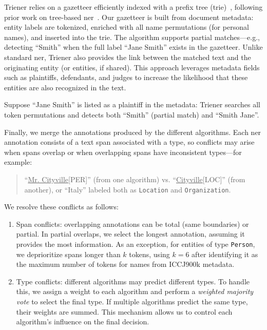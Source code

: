 Trie\ac{ner} relies on a gazetteer efficiently indexed with a prefix tree (trie)~\cite{s-yata-marisa-trie}, following prior work on tree-based \ac{ner}~\cite{Nguyen_tree_ner_2014}.  
Our gazetteer is built from document metadata: entity labels are tokenized, enriched with all name permutations (for personal names), and inserted into the trie.  
The algorithm supports partial matches---e.g., detecting ``Smith'' when the full label ``Jane Smith'' exists in the gazetteer.  
Unlike standard \ac{ner}, Trie\ac{ner} also provides the link between the matched text and the originating entity (or entities, if shared).  
This approach leverages metadata fields such as plaintiffs, defendants, and judges to increase the likelihood that these entities are also recognized in the text.

Suppose ``Jane Smith'' is listed as a plaintiff in the metadata: Trie\ac{ner} searches all token permutations and detects both ``Smith'' (partial match) and ``Smith Jane''.

Finally, we merge the annotations produced by the different algorithms.  
Each \ac{ner} annotation consists of a text span associated with a type, so conflicts may arise when spans overlap or when overlapping spans have inconsistent types---for example:
\begin{quote}
``\underline{Mr. Cityville}[PER]'' (from one algorithm) vs. ``\underline{Cityville}[LOC]'' (from another),  
or ``Italy'' labeled both as \texttt{Location} and \texttt{Organization}.
\end{quote}

We resolve these conflicts as follows:
\begin{enumerate}
    \item Span conflicts: overlapping annotations can be total (same boundaries) or partial.  
    In partial overlaps, we select the longest annotation, assuming it provides the most information.  
    As an exception, for entities of type \texttt{Person}, we deprioritize spans longer than $k$ tokens, using $k=6$ after identifying it as the maximum number of tokens for names from ICCJ900k metadata.
    \item Type conflicts: different algorithms may predict different types.  
    To handle this, we assign a weight to each algorithm and perform a \textit{weighted majority vote} to select the final type.  
    If multiple algorithms predict the same type, their weights are summed.  
    This mechanism allows us to control each algorithm's influence on the final decision.
\end{enumerate}



